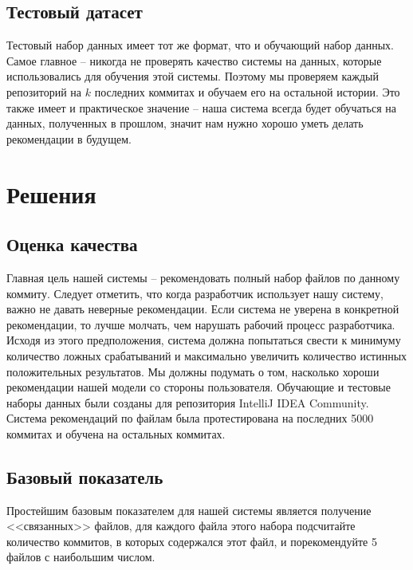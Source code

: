 \documentclass[times]{itmo-student-thesis}
\begin{document}
\subsection{Тестовый датасет}
Тестовый набор данных имеет тот же формат, что и обучающий набор данных. Самое главное -- никогда не проверять качество системы на данных, которые использовались для обучения этой системы. Поэтому мы проверяем каждый репозиторий на $k$ последних коммитах и обучаем его на остальной истории. Это также имеет и практическое значение -- наша система всегда будет обучаться на данных, полученных в прошлом, значит нам нужно хорошо уметь делать рекомендации в будущем.
\section{Решения}
\subsection{Оценка качества}
Главная цель нашей системы -- рекомендовать полный набор файлов по данному коммиту. Следует отметить, что когда разработчик использует нашу систему, важно не давать неверные рекомендации. Если система не уверена в конкретной рекомендации, то лучше молчать, чем нарушать рабочий процесс разработчика. Исходя из этого предположения, система должна попытаться свести к минимуму количество ложных срабатываний и максимально увеличить количество истинных положительных результатов. Мы должны подумать о том, насколько хороши рекомендации нашей модели со стороны пользователя. Обучающие и тестовые наборы данных были созданы для репозитория IntelliJ IDEA Community. Система рекомендаций по файлам была протестирована на последних 5000 коммитах и обучена на остальных коммитах.
\subsection{Базовый показатель}
Простейшим базовым показателем для нашей системы является получение <<связанных>> файлов, для каждого файла этого набора подсчитайте количество коммитов, в которых содержался этот файл, и порекомендуйте 5 файлов с наибольшим числом.
\end{document}
